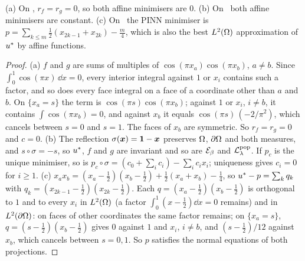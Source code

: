 \begin{proposition}\label{sA_proofs:prop:struct}
(a) On \Pcospair, $r_f=r_g=0$, so both affine minimisers are $0$.
(b) On \Pridge\ both affine minimisers are constant.
(c) On \Pone\ the PINN minimiser is $p=\sum_{k\le m}\frac12(x_{2k-1}+x_{2k})-\frac m4$, which is also
the best $L^2(\Omega)$ approximation of $u^{*}$ by affine functions.
\end{proposition}
\begin{proof}
(a) $f$ and $g$ are sums of multiples of $\cos(\pi x_a)\cos(\pi x_b)$, $a\ne b$. Since
$\int_0^1\cos(\pi x)\,\dd x=0$, every interior integral against $1$ or $x_i$ contains such a factor,
and so does every face integral on a face of a coordinate other than $a$ and $b$. On $\{x_a=s\}$ the
term is $\cos(\pi s)\cos(\pi x_b)$; against $1$ or $x_i$, $i\ne b$, it contains
$\int\cos(\pi x_b)=0$, and against $x_b$ it equals $\cos(\pi s)\,(-2/\pi^2)$, which cancels between
$s=0$ and $s=1$. The faces of $x_b$ are symmetric. So $r_f=r_g=0$ and $c=0$.
(b) The reflection $\sigma(\boldsymbol{x})=\mathbf1-\boldsymbol{x}$ preserves $\Omega$, $\partial\Omega$ and both measures, and
$s\circ\sigma=-s$, so $u^{*}$, $f$ and $g$ are invariant and so are $\mathcal{E}_{\beta}$ and $\mathcal{L}^{\mathrm{pop}}_\lambda$. If $p_c$ is
the unique minimiser, so is $p_c\circ\sigma=(c_0+\sum_ic_i)-\sum_ic_ix_i$; uniqueness gives $c_i=0$
for $i\ge1$.
(c) $x_ax_b=(x_a-\frac12)(x_b-\frac12)+\frac12(x_a+x_b)-\frac14$, so $u^{*}-p=\sum_kq_k$ with
$q_k=(x_{2k-1}-\frac12)(x_{2k}-\frac12)$. Each $q=(x_a-\frac12)(x_b-\frac12)$ is orthogonal to $1$
and to every $x_i$ in $L^2(\Omega)$ (a factor $\int_0^1(x-\frac12)\dd x=0$ remains) and in $L^2(\partial\Omega)$:
on faces of other coordinates the same factor remains; on $\{x_a=s\}$, $q=(s-\frac12)(x_b-\frac12)$
gives $0$ against $1$ and $x_i$, $i\ne b$, and $(s-\frac12)/12$ against $x_b$, which cancels between
$s=0,1$. So $p$ satisfies the normal equations of both projections.
\end{proof}

